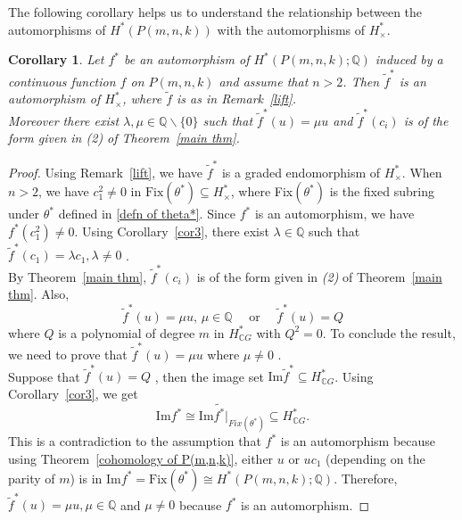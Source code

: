 \documentclass{amsart}
\newtheorem{corollary}[theorem]{Corollary}
\newcommand{\thmref}[1]{Theorem~\ref{#1}}
\newcommand{\corref}[1]{Corollary~\ref{#1}}
\newcommand{\remref}[1]{Remark~\ref{#1}}
\newcommand{\im}{\mathrm{Im}}
\newcommand{\fix}{\mathrm{Fix}}
\begin{document}
	The following corollary helps %
us to understand the relationship between the automorphisms of $H^*(P(m,n,k))$ with the automorphisms of $H^*_{\times}$.
	\begin{corollary}\label{automor}
		Let $f^*$ be an automorphism of $H^*(P(m,n,k);\mathbb{Q})$ induced by a continuous function $f$ on $P(m,n,k)$ and assume that $n> 2$. Then $\tilde{f}^*$ is an automorphism of $H^*_{\times}$, where $\tilde{f}$ is as in \remref{lift}. \\ Moreover there exist $\lambda, \mu \in \mathbb{Q}\backslash \{0\}$ such that $\tilde{f}^*(u) = \mu u$ and $\tilde{f}^*(c_i)$ is of the form given in \textit{(2)} of \thmref{main thm}.
	\end{corollary}
	\begin{proof}
		Using \remref{lift}, we have $\tilde{f}^*$ is a graded endomorphism of $H^*_{\times}$. When $n>2$, we have $c_1^2\neq 0$ in $\fix (\theta^*)\subseteq H^*_\times$, where Fix$(\theta^*)$ is the fixed subring under $\theta^*$ defined in \eqref{defn of theta*}. Since $f^*$ is an automorphism, we have $f^*(c_1^2) \neq 0$. Using \corref{cor3}, there exist $\lambda \in \mathbb{Q}$ such that $\tilde{f}^*(c_1) = \lambda c_1, \lambda \neq 0$%
.\\
		By \thmref{main thm}, $\tilde{f}^*(c_i)$ %
is of the form given in \textit{(2)} of \thmref{main thm}. %
Also, $$\tilde{f}^*(u) = \mu u, \, \mu \in \mathbb{Q} \quad \text{ or } \quad \tilde{f}^*(u) = Q$$ where %
$Q$ is a polynomial of degree $m$ in $H^*_{\mathbb{C}G}$ with $Q^2 =0$. To conclude the result, we need to prove that $\tilde{f}^*(u) = \mu u$ where $\mu \neq 0$%
. \\
		Suppose that $\tilde{f}^*(u) = Q$%
, then the image set $\im \tilde{f}^*\subseteq H^*_{\mathbb{C}G}$. Using \corref{cor3}, we get $$\im f^*  \cong \im \tilde{f^*}|_{Fix (\theta^*)}\subseteq H^*_{\mathbb{C}G}.$$ This is a contradiction to the assumption that $f^*$ is an %
automorphism because using %
\thmref{cohomology of P(m,n,k)}, either $u$ or $uc_{1}$ (depending on the parity of $m$) is in $\im f^*=\fix (\theta^*) \cong H^*(P(m,n,k);\mathbb{Q})$. Therefore, $\tilde{f}^*(u) = \mu u, \mu \in \mathbb{Q}$ and $\mu \neq 0$ because $f^*$ is an %
automorphism.
	\end{proof}
\end{document}
